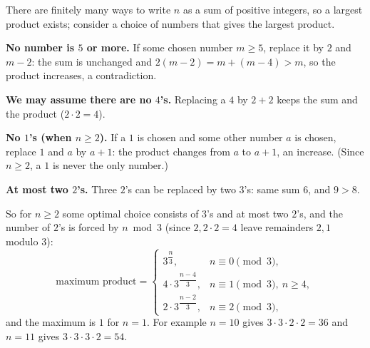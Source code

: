 There are finitely many ways to write $n$ as a sum of positive integers, so a largest product exists; consider a choice of numbers that gives the largest product.

\textbf{No number is $5$ or more.} If some chosen number $m\ge5$, replace it by $2$ and $m-2$: the sum is unchanged and $2(m-2)=m+(m-4)>m$, so the product increases, a contradiction.

\textbf{We may assume there are no $4$'s.} Replacing a $4$ by $2+2$ keeps the sum and the product ($2\cdot2=4$).

\textbf{No $1$'s (when $n\ge2$).} If a $1$ is chosen and some other number $a$ is chosen, replace $1$ and $a$ by $a+1$: the product changes from $a$ to $a+1$, an increase. (Since $n\ge2$, a $1$ is never the only number.)

\textbf{At most two $2$'s.} Three $2$'s can be replaced by two $3$'s: same sum $6$, and $9>8$.

So for $n\ge2$ some optimal choice consists of $3$'s and at most two $2$'s, and the number of $2$'s is forced by $n\bmod3$ (since $2,2\cdot2=4$ leave remainders $2,1$ modulo $3$):
\[\text{maximum product}=\begin{cases}3^{\dfrac n3}, & n\equiv0\pmod3,\\[2ex] 4\cdot3^{\dfrac{n-4}{3}}, & n\equiv1\pmod3,\ n\ge4,\\[2ex] 2\cdot3^{\dfrac{n-2}{3}}, & n\equiv2\pmod3,\end{cases}\]
and the maximum is $1$ for $n=1$. For example $n=10$ gives $3\cdot3\cdot2\cdot2=36$ and $n=11$ gives $3\cdot3\cdot3\cdot2=54$.
